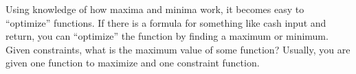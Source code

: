 \documentclass[../revisedmain.tex]{subfiles}
\begin{document}
	Using knowledge of how maxima and minima work, it becomes easy to ``optimize'' functions. If there is a formula for something like cash input and return, you can ``optimize'' the function by finding a maximum or minimum. Given constraints, what is the maximum value of some function? Usually, you are given one function to maximize and one constraint function.\\
\end{document}
